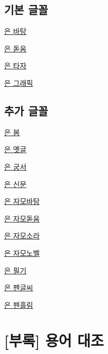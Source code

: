 \subsection*{기본 글꼴}

\underline{은 바탕}\\
\bigskip

\underline{은 돋움}\\
\bigskip

\underline{은 타자}\\
\bigskip

\underline{은 그래픽}\\
\bigskip

\subsection*{추가 글꼴}

\underline{은 봄}\\
\bigskip

\underline{은 옛글}\\
{
 \interhchar{0pt}
}
\bigskip

\underline{은 궁서}\\
\bigskip

\underline{은 신문}\\
\bigskip

\underline{은 자모바탕}\\
\bigskip

\underline{은 자모돋움}\\
\bigskip

\underline{은 자모소라}\\
\bigskip

\underline{은 자모노벨}\\
\bigskip

\underline{은 필기}\\
\bigskip

\underline{은 펜글씨}\\
\bigskip

\underline{은 펜흘림}\\
\bigskip

\fi

\clearpage{}
\section*{[부록] 용어 대조}

